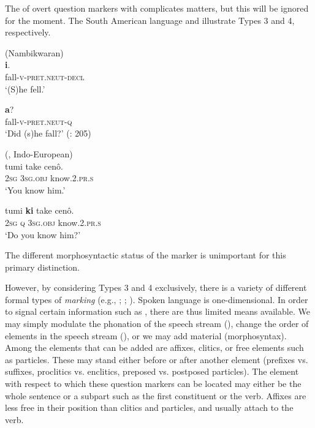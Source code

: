 The  of overt question markers with  complicates matters, but this will be ignored for the moment. The South American language   and   illustrate Types 3 and 4, respectively.

\ea%
    \label{ex:4:9}
     (Nambikwaran)\\
    \ea
    \textbf{{i}}.\\
    fall-\textsc{v}-\textsc{pret.neut}-\textsc{decl}\\
    \glt ‘(S)he fell.’

    \ex
    \textbf{{a}}?\\
    fall-\textsc{v}-\textsc{pret.neut}-\textsc{q}\\
    \glt \glt ‘Did (s)he fall?’ (\citealt{Araujo2004}: 205)
    \z
    \z

\ea%
    \label{ex:4:10}
     (, Indo-European)\\
    \ea
    \gll tumi    take    cenô.\\
    2\textsc{sg}    3\textsc{sg}.\textsc{obj}  know.2.\textsc{pr.s}\\
    \glt ‘You know him.’
    
    \ex
    \gll tumi \textbf{{ki}} take    cenô.\\
    2\textsc{sg}  \textsc{q}  3\textsc{sg}.\textsc{obj}  know.2.\textsc{pr.s}\\
    \glt ‘Do you know him?’ \citep[200]{Thompson2012}
    \z
\z

\noindent The different morphosyntactic status of the marker is unimportant for this primary distinction.

However, by considering Types 3 and 4 exclusively, there is a variety of different formal types of \textit{ marking} (e.g., \citealt{Siemund2001}; \citealt{Miestamo2011}; \citealt{Dryer2013k,Dryer2013m}). Spoken language is one-dimensional. In order to signal certain information such as , there are thus limited means available. We may simply modulate the phonation of the speech stream (), change the order of elements in the speech stream (), or we may add material (morphosyntax). Among the elements that can be added are affixes, clitics, or free elements such as particles. These may stand either before or after another element (prefixes vs. suffixes, proclitics vs. enclitics, preposed vs. postposed particles). The element with respect to which these question markers can be located may either be the whole sentence or a subpart such as the first constituent or the verb. Affixes are less free in their position than clitics and particles, and usually attach to the verb.


